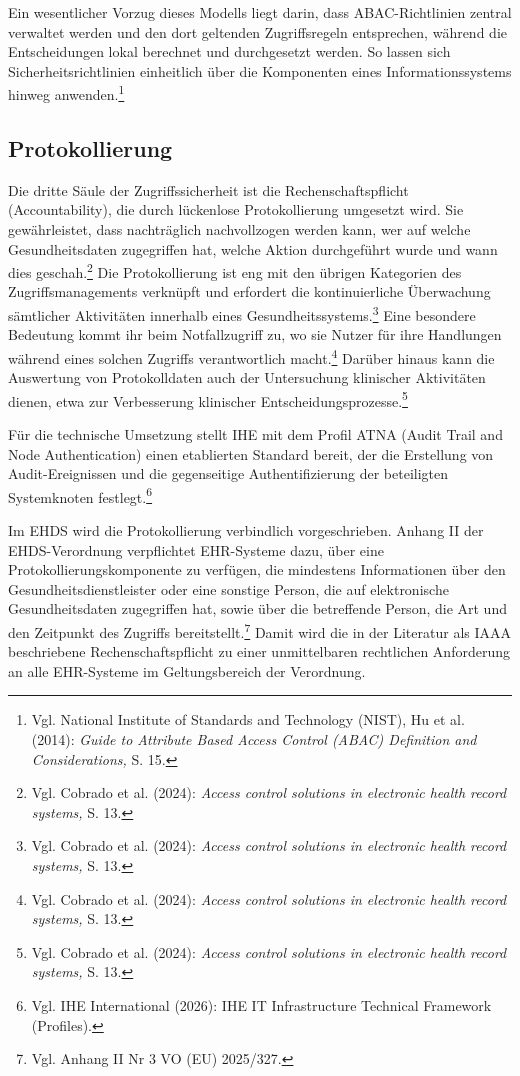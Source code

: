 Ein wesentlicher Vorzug dieses Modells liegt darin, dass ABAC-Richtlinien zentral verwaltet werden und den dort geltenden Zugriffsregeln entsprechen, während die Entscheidungen lokal berechnet und durchgesetzt werden. So lassen sich Sicherheitsrichtlinien einheitlich über die Komponenten eines Informationssystems hinweg anwenden.\footnote{Vgl. National Institute of Standards and Technology (NIST), Hu et al. (2014):  \textit{Guide to Attribute Based Access Control (ABAC) Definition and Considerations,} S. 15.}



    \subsection{Protokollierung}
Die dritte Säule der Zugriffssicherheit ist die Rechenschaftspflicht (Accountability), die durch lückenlose Protokollierung umgesetzt wird. Sie gewährleistet, dass nachträglich nachvollzogen werden kann, wer auf welche Gesundheitsdaten zugegriffen hat, welche Aktion durchgeführt wurde und wann dies geschah.\footnote{Vgl. Cobrado et al. (2024):  \textit{Access control solutions in electronic health record systems,} S. 13.} Die Protokollierung ist eng mit den übrigen Kategorien des Zugriffsmanagements verknüpft und erfordert die kontinuierliche Überwachung sämtlicher Aktivitäten innerhalb eines Gesundheitssystems.\footnote{Vgl. Cobrado et al. (2024):  \textit{Access control solutions in electronic health record systems,} S. 13.} Eine besondere Bedeutung kommt ihr beim Notfallzugriff zu, wo sie Nutzer für ihre Handlungen während eines solchen Zugriffs verantwortlich macht.\footnote{Vgl. Cobrado et al. (2024):  \textit{Access control solutions in electronic health record systems,} S. 13.} Darüber hinaus kann die Auswertung von Protokolldaten auch der Untersuchung klinischer Aktivitäten dienen, etwa zur Verbesserung klinischer Entscheidungsprozesse.\footnote{Vgl. Cobrado et al. (2024):  \textit{Access control solutions in electronic health record systems,} S. 13.}

Für die technische Umsetzung stellt IHE mit dem Profil ATNA (Audit Trail and Node Authentication) einen etablierten Standard bereit, der die Erstellung von Audit-Ereignissen und die gegenseitige Authentifizierung der beteiligten Systemknoten festlegt.\footnote{Vgl. IHE International (2026): IHE IT Infrastructure Technical Framework (Profiles).}

Im EHDS wird die Protokollierung verbindlich vorgeschrieben. Anhang II der EHDS-Verordnung verpflichtet EHR-Systeme dazu, über eine Protokollierungskomponente zu verfügen, die mindestens Informationen über den Gesundheitsdienstleister oder eine sonstige Person, die auf elektronische Gesundheitsdaten zugegriffen hat, sowie über die betreffende Person, die Art und den Zeitpunkt des Zugriffs bereitstellt.\footnote{Vgl. Anhang II Nr 3 VO (EU) 2025/327.} Damit wird die in der Literatur als IAAA beschriebene Rechenschaftspflicht zu einer unmittelbaren rechtlichen Anforderung an alle EHR-Systeme im Geltungsbereich der Verordnung.


